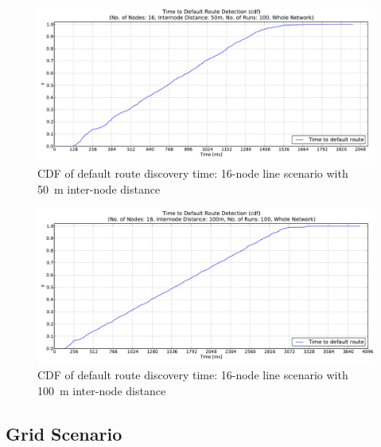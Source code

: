 \begin{figure}[htpb]
  \begin{center}
    \leavevmode
      \includegraphics[scale=0.38]
      {Pics/results/16/MRHOF/line/dist50_montecarlo_cdf_hist.pdf}
   \caption{CDF of default route discovery time: 16-node line scenario with 50~m inter-node distance}
   \label{fig:16_MRHOF_line_50_cdf}
  \end{center}
\end{figure}

\begin{figure}[htpb]
  \begin{center}
    \leavevmode
      \includegraphics[scale=0.38]
      {Pics/results/16/MRHOF/line/dist100_montecarlo_cdf_hist.pdf}
   \caption{CDF of default route discovery time: 16-node line scenario with 100~m inter-node distance}
   \label{fig:16_MRHOF_line_100_cdf}
    \vspace{6in}
  \end{center}
\end{figure}

\clearpage
\subsection{Grid Scenario}
\label{Appx:cdf:grid}

